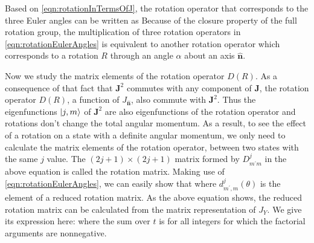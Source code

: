 Based on \autoref{eqn:rotationInTermsOfJ}, the rotation operator that corresponds to the three Euler angles can be 
written as
Because of the closure property of the full rotation group, the multiplication of three rotation operators in 
\autoref{eqn:rotationEulerAngles} is equivalent to another rotation operator
which corresponds to a rotation $R$  through an angle $\alpha$ about an axis $\mathbf{\hat{n}}$. 

Now we study the 
matrix elements of the rotation operator $D(R)$. As a consequence of that fact that $\mathbf{J}^2$ commutes with 
any component of $\mathbf{J}$,  the rotation operator $D(R)$, a function of $J_{\mathbf{\hat{n}}}$, also commute
with $\mathbf{J}^2$. Thus the eigenfunctions $| j, m \rangle$ of $\mathbf{J}^2$ are also eigenfunctions of the rotation
operator and rotations don't change the total angular momentum. 
As a result, to see the effect of a rotation on a state with a definite angular momentum, we only need to calculate the
 matrix elements of the rotation operator, 
between two states with the same $j$ value. 
The $(2 j + 1) \times (2 j + 1)$ matrix formed by $D^{j}_{m^{\prime} m}$ in the above equation is called the rotation
matrix.  Making use of \autoref{eqn:rotationEulerAngles}, we can easily show that
where $d^j_{m^{\prime}, m}(\theta)$ is the element of a reduced rotation matrix. As the above equation shows, the
reduced rotation matrix can be calculated from the matrix representation of $J_Y$. We give its 
expression here:
where the sum over $t$ is for all integers for which the factorial arguments are nonnegative. 

